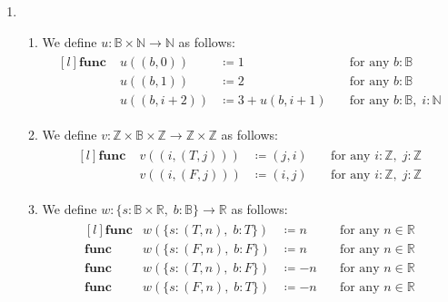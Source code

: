 \documentclass[12pt]{article}
\theoremstyle{definitionstyle}
\def\mbb#1{\mathbb{#1}}
\def\bN{\mbb{N}}
\def \R{\mbb{R}}
\def\bZ{\mbb{Z}}
\newcommand{\func}{\mathbf{func}}
\begin{document}
\begin{enumerate}[leftmargin=\labelsep]
        \newpage
        \item \begin{enumerate}
            \item We define $u: \mbb B \times \bN \to \bN$ as follows:
            \begin{align*}
                \begin{matrix*}[l]
                    \func\; &u((b, 0)) &\coloneqq 1 \quad &\text{for any $b : \mbb B$}\\
                    &u((b, 1))  &\coloneqq 2 \quad &\text{for any $b : \mbb B$}\\
                    &u((b,i+2)) &\coloneqq 3 + u(b, i+1) \quad &\text{for any $b : \mbb B,\; i : \bN$}
                \end{matrix*}
            \end{align*}
            \item We define $v: \bZ \times \mbb B \times \bZ \to \bZ \times \bZ$ as follows:
            \begin{align*}
                \begin{matrix*}[l]
                    \func\; &v((i, (T, j))) &\coloneqq (j, i) \quad &\text{for any $i : \bZ,\; j : \bZ$} \\
                    &v((i, (F, j))) &\coloneqq (i,j) \quad &\text{for any $i : \bZ,\; j : \bZ$}
                \end{matrix*}
            \end{align*}
            \item We define $w: \{s: \mbb B \times \R,\; b: \mbb B\} \to \R$ as follows:
            \begin{align*}
                \begin{matrix*}[l]
                    \func &w(\{s: (T, n),\; b: T\}) &\coloneqq n \quad &\text{for any $n \in \R$} \\
                    \func &w(\{s: (F, n),\; b: F\}) &\coloneqq n \quad &\text{for any $n \in \R$} \\
                    \func &w(\{s: (T, n),\; b: F\}) &\coloneqq -n \quad &\text{for any $n \in \R$} \\
                    \func &w(\{s: (F, n),\; b: T\}) &\coloneqq -n \quad &\text{for any $n \in \R$} \\
                \end{matrix*}
            \end{align*}
        \end{enumerate}


\end{enumerate}
\end{document}
